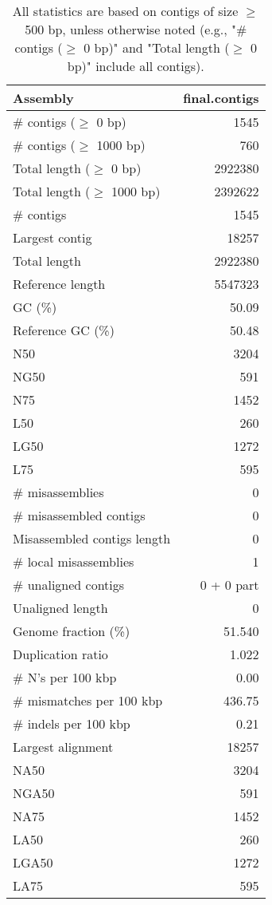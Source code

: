\documentclass[12pt,a4paper]{article}
\begin{document}
\begin{table}[ht]
\begin{center}
\caption{All statistics are based on contigs of size $\geq$ 500 bp, unless otherwise noted (e.g., "\# contigs ($\geq$ 0 bp)" and "Total length ($\geq$ 0 bp)" include all contigs).}
\begin{tabular}{|l*{1}{|r}|}
\hline
Assembly & final.contigs \\ \hline
\# contigs ($\geq$ 0 bp) & 1545 \\ \hline
\# contigs ($\geq$ 1000 bp) & 760 \\ \hline
Total length ($\geq$ 0 bp) & 2922380 \\ \hline
Total length ($\geq$ 1000 bp) & 2392622 \\ \hline
\# contigs & 1545 \\ \hline
Largest contig & 18257 \\ \hline
Total length & 2922380 \\ \hline
Reference length & 5547323 \\ \hline
GC (\%) & 50.09 \\ \hline
Reference GC (\%) & 50.48 \\ \hline
N50 & 3204 \\ \hline
NG50 & 591 \\ \hline
N75 & 1452 \\ \hline
L50 & 260 \\ \hline
LG50 & 1272 \\ \hline
L75 & 595 \\ \hline
\# misassemblies & 0 \\ \hline
\# misassembled contigs & 0 \\ \hline
Misassembled contigs length & 0 \\ \hline
\# local misassemblies & 1 \\ \hline
\# unaligned contigs & 0 + 0 part \\ \hline
Unaligned length & 0 \\ \hline
Genome fraction (\%) & 51.540 \\ \hline
Duplication ratio & 1.022 \\ \hline
\# N's per 100 kbp & 0.00 \\ \hline
\# mismatches per 100 kbp & 436.75 \\ \hline
\# indels per 100 kbp & 0.21 \\ \hline
Largest alignment & 18257 \\ \hline
NA50 & 3204 \\ \hline
NGA50 & 591 \\ \hline
NA75 & 1452 \\ \hline
LA50 & 260 \\ \hline
LGA50 & 1272 \\ \hline
LA75 & 595 \\ \hline
\end{tabular}
\end{center}
\end{table}
\end{document}
